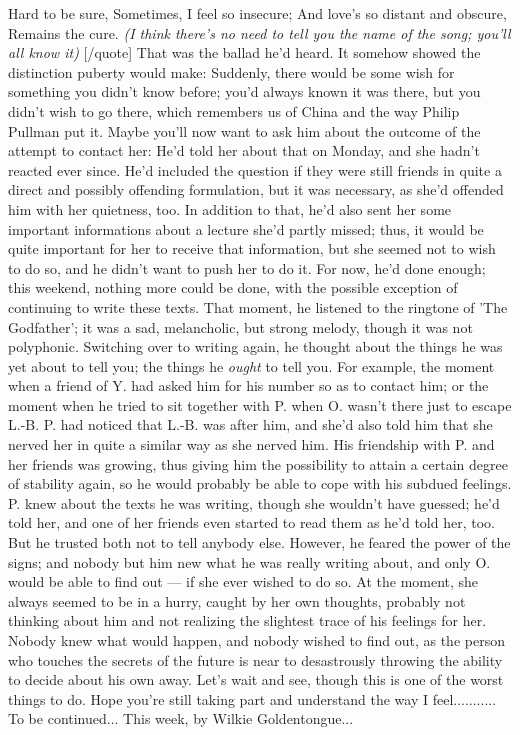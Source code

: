 Hard to be sure,
Sometimes, I feel so insecure;
And love's so distant and obscure,
Remains the cure. 
\emph{(I think there's no need to tell you the name of the song; you'll all know it)}
[/quote]
That was the ballad he'd heard. 
It somehow showed the distinction puberty would make: Suddenly, there would be some wish for something you didn't know before; you'd always known it was there, but you didn't wish to go there, which remembers us of China and the way Philip Pullman put it. 
Maybe you'll now want to ask him about the outcome of the attempt to contact her: He'd told her about that on Monday, and she hadn't reacted ever since. He'd included the question if they were still friends in quite a direct and possibly offending formulation, but it was necessary, as she'd offended him with her quietness, too. In addition to that, he'd also sent her some important informations about a lecture she'd partly missed; thus, it would be quite important for her to receive that information, but she seemed not to wish to do so, and he didn't want to push her to do it. 
For now, he'd done enough; this weekend, nothing more could be done, with the possible exception of continuing to write these texts. 
That moment, he listened to the ringtone of 'The Godfather'; it was a sad, melancholic, but strong melody, though it was not polyphonic. 
Switching over to writing again, he thought about the things he was yet about to tell you; the things he \emph{ought} to tell you. For example, the moment when a friend of Y. had asked him for his number so as to contact him; or the moment when he tried to sit together with P. when O. wasn't there just to escape L.-B. 
P. had noticed that L.-B. was after him, and she'd also told him that she nerved her in quite a similar way as she nerved him. His friendship with P. and her friends was growing, thus giving him the possibility to attain a certain degree of stability again, so he would probably be able to cope with his subdued feelings. P. knew about the texts he was writing, though she wouldn't have guessed; he'd told her, and one of her friends even started to read them as he'd told her, too. But he trusted both not to tell anybody else. 
However, he feared the power of the signs; and nobody but him new what he was really writing about, and only O. would be able to find out --- if she ever wished to do so. 
At the moment, she always seemed to be in a hurry, caught by her own thoughts, probably not thinking about him and not realizing the slightest trace of his feelings for her. 
Nobody knew what would happen, and nobody wished to find out, as the person who touches the secrets of the future is near to desastrously throwing the ability to decide about his own away. 
Let's wait and see, though this is one of the worst things to do. 
Hope you're still taking part and understand the way I feel...........
To be continued...
This week, by Wilkie Goldentongue...

